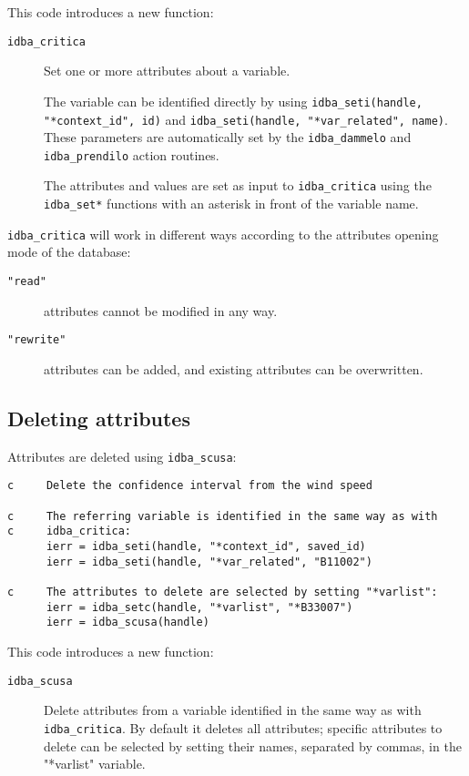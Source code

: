 \documentclass[final,12pt,a4paper,twoside]{book}
\begin{document}
This code introduces a new function:

\begin{description}
\item[{\tt idba\_critica}]
  Set one or more attributes about a variable.
  
  The variable can be identified directly by using {\tt idba\_seti(handle,
  "*context\_id", id)} and {\tt idba\_seti(handle, "*var\_related", name)}.
  These parameters are automatically set by the {\tt idba\_dammelo} and {\tt
  idba\_prendilo} action routines.

  The attributes and values are set as input to {\tt idba\_critica} using the
  {\tt idba\_set*} functions with an asterisk in front of the variable name.
\end{description}


{\tt idba\_critica} will work in different ways according to the attributes
opening mode of the database:

\begin{description}
\item[{\tt "read"}] attributes cannot be modified in any way.
\item[{\tt "rewrite"}] attributes can be added, and existing attributes can be
                   overwritten.
\end{description}


\subsection{Deleting attributes}

Attributes are deleted using {\tt idba\_scusa}:

\label{fun-idba_scusa}

\begin{verbatim}
c     Delete the confidence interval from the wind speed

c     The referring variable is identified in the same way as with
c     idba_critica:
      ierr = idba_seti(handle, "*context_id", saved_id)
      ierr = idba_seti(handle, "*var_related", "B11002")

c     The attributes to delete are selected by setting "*varlist":
      ierr = idba_setc(handle, "*varlist", "*B33007")
      ierr = idba_scusa(handle)
\end{verbatim}

This code introduces a new function:

\begin{description}
\item[{\tt idba\_scusa}]
  Delete attributes from a variable identified in the same way as with {\tt
  idba\_critica}.  By default it deletes all attributes; specific attributes to
  delete can be selected by setting their names, separated by commas, in the
  "*varlist" variable.
\end{description}
\end{document}
